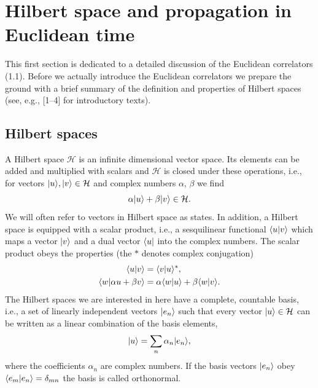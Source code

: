 \section{Hilbert space and propagation in Euclidean time}

This first section is dedicated to a detailed discussion of the Euclidean
correlators (1.1). Before we actually introduce the Euclidean correlators we
prepare the ground with a brief summary of the definition and properties of
Hilbert spaces (see, e.g., [1--4] for introductory texts).

\subsection{Hilbert spaces}

A Hilbert space $\mathcal{H}$ is an infinite dimensional vector space. Its
elements can be added and multiplied with scalars and $\mathcal{H}$ is closed
under these operations, i.e., for vectors $|u\rangle, |v\rangle \in
\mathcal{H}$ and complex numbers $\alpha$, $\beta$ we find
\begin{equation}
  \alpha|u\rangle + \beta|v\rangle \in \mathcal{H}.
\end{equation}
We will often refer to vectors in Hilbert space as states. In addition, a
Hilbert space is equipped with a scalar product, i.e., a sesquilinear
functional $\langle u|v\rangle$ which maps a vector $|v\rangle$ and a dual vector
$\langle u|$ into the complex numbers. The scalar product obeys the properties
(the $*$ denotes complex conjugation)
\begin{align}
  \langle u|v\rangle &= \langle v|u\rangle^*, \\
  \langle w|\alpha u + \beta v\rangle &= \alpha\langle w|u\rangle + \beta\langle w|v\rangle.
\end{align}
The Hilbert spaces we are interested in here have a complete, countable basis,
i.e., a set of linearly independent vectors $|e_n\rangle$ such that every vector
$|u\rangle \in \mathcal{H}$ can be written as a linear combination of the basis
elements,
\begin{equation}
  |u\rangle = \sum_n \alpha_n |e_n\rangle,
\end{equation}
where the coefficients $\alpha_n$ are complex numbers. If the basis vectors
$|e_n\rangle$ obey $\langle e_m|e_n\rangle = \delta_{mn}$ the basis is called
orthonormal.

